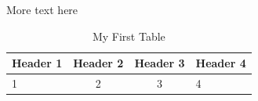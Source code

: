 \documentclass{article}
\begin{document}
More text here

\begin{table}
    \centering
    \begin{tabular}{lccp{0.1\testwidth}}
        \toprule
        Header 1    &   Header 2    &   Header 3    &   Header 4 \\
        \midrule
        1           &   2           &   3           &   4   \\
        \bottomrule
    \end{tabular}
    \caption{My First Table}\label{tab:first-table}
\end{table}
\end{document}

